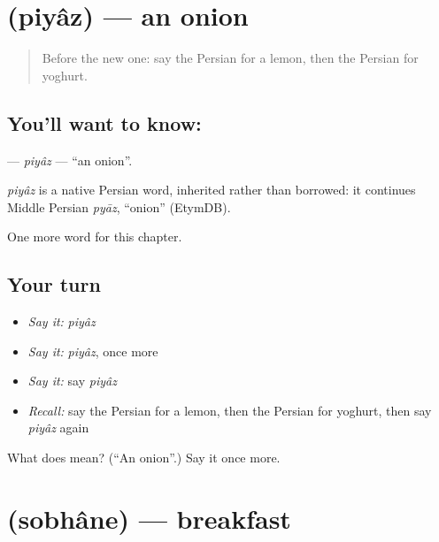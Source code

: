 \section[\texorpdfstring{\fa{پیاز} (piyâz)}{پیاز (piyâz)}]{ (piyâz) — an onion}

\label{lesson:FA-C43-piyaz}



\begin{quote}
Before the new one: say the Persian for a lemon, then the Persian for yoghurt.
\end{quote}

\subsection*{You'll want to know: }
\textbf{} — \emph{piyâz} — \textquotedblleft{}an onion\textquotedblright{}.

\begin{cousinweb}
\emph{piyâz} is a native Persian word, inherited rather than borrowed: it continues Middle Persian \emph{pyāz}, \textquotedblleft{}onion\textquotedblright{} (EtymDB).
\end{cousinweb}

\begin{grammarlens}[title={What you've built}]
One more word for this chapter.
\end{grammarlens}

\subsection*{Your turn}
\begin{itemize}
\raggedright
  \item \emph{Say it:} \emph{piyâz}
  \item \emph{Say it:} \emph{piyâz}, once more
  \item \emph{Say it:} say \emph{piyâz}
  \item \emph{Recall:} say the Persian for a lemon, then the Persian for yoghurt, then say \emph{piyâz} again
\end{itemize}

\begin{tcolorbox}[breakable,colback=teal!4,colframe=teal!35!black,title={Before you move on}]
What does  mean? (\textquotedblleft{}An onion\textquotedblright{}.) Say it once more.
\end{tcolorbox}
\section[\texorpdfstring{\fa{صبحانه} (sobhâne)}{صبحانه (sobhâne)}]{ (sobhâne) — breakfast}

